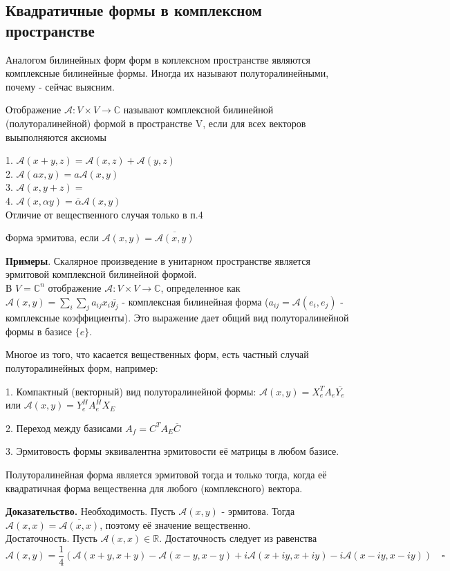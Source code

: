 \subsection{Квадратичные формы в комплексном пространстве}
Аналогом билинейных форм форм в коплексном пространстве являются комплексные
билинейные формы. Иногда их называют полуторалинейными, почему - сейчас выясним.
\begin{defin}
Отображение $\mathcal A\colon V\times V\to\mathbb C$
называют комплексной билинейной (полуторалинейной) формой в пространстве V,
если для всех векторов выыполняются аксиомы
\end{defin}
1. $\mathcal A(x+y,z)=\mathcal A(x,z)+\mathcal A(y,z)$\\
2. $\mathcal A(ax,y)=a\mathcal A(x,y)$\\
3. $\mathcal A(x,y+z)=$\\
4. $\mathcal A(x,\alpha y)=\overline{\alpha}\mathcal A(x,y)$\\
Отличие от вещественного случая только в п.4
\begin{defin}
Форма эрмитова, если $\mathcal A(x,y)=\overline{\mathcal A(x,y)}$
\end{defin}
\textbf{Примеры}. Скалярное произведение в унитарном пространстве является
эрмитовой комплексной билинейной формой. \\
В $V=\mathbb C^n$ отображение $\mathcal A\colon V\times V\to\mathbb C$, 
определенное как $\mathcal A(x,y)=\sum_i\sum_ja_{ij}x_i\overline{y_j}$ -
комплексная билинейная форма ($a_{ij}=\mathcal A(e_i,e_j)$ - комплексные 
коэффициенты). Это выражение дает общий вид полуторалинейной формы в базисе 
$\{e\}$.

Многое из того, что касается вещественных форм, есть частный случай 
полуторалинейных форм, например:

1. Компактный (векторный) вид полуторалинейной формы: $\mathcal 
A(x,y)=X_e^TA_e\overline{Y_e}$ или $\mathcal A(x,y)=Y_e^HA_e^HX_E$

2. Переход между базисами $A_f=C^TA_E\overline{C}$

3. Эрмитовость формы эквивалентна эрмитовости её матрицы в любом базисе.
\begin{theor}\label{hermite_form}
Полуторалинейная форма является эрмитовой тогда и только тогда, когда её 
квадратичная форма вещественна для любого (комплексного) вектора.
\end{theor}
\textbf{Доказательство.} Необходимость. Пусть $\mathcal A(x,y)$ - эрмитова. 
Тогда $\mathcal A(x,x)=\overline{\mathcal A(x,x)}$, поэтому её значение
вещественно. \\
Достаточность. Пусть $\mathcal A(x,x)\in\mathbb R$. Достаточность следует из 
равенства $$\mathcal A(x,y)=\frac14(\mathcal A(x+y,x+y)-\mathcal A(x-y,x-y)
+i\mathcal A(x+iy,x+iy)-i\mathcal A(x-iy,x-iy))\quad\square$$

